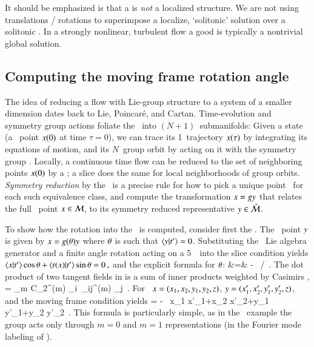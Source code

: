 It should be emphasized is that a {\template} is \emph{not} a
{localized} structure. We are not using translations / rotations to
superimpose a localize, `solitonic' solution over a solitonic {\template}. In
a strongly nonlinear, turbulent flow a good {\template} is typically a
nontrivial global solution.

\subsection{Computing the moving frame rotation angle}
\label{exam:CLErotAngle}

															\toCB
The idea of reducing a flow with Lie-group structure to a system of
a smaller dimension dates back to Lie, Poincar\'e, and Cartan.
Time-evolution and symmetry group actions foliate the \statesp\ into
$(N\!+\!1)$\dmn\ submanifolds: Given a state (a \statesp\ point $x(0)$
at time $\tau=0$), we can trace its  1\dmn\ trajectory $x(\tau)$ by
integrating its equations of motion, and its $N$\dmn\ group orbit by
acting on it with the symmetry group \Group. Locally, a continuous time
flow can be reduced to the set of neighboring points $x(0)$ by a
\PoincSec; a slice does the same for local neighborhoods of group orbits.
{\em Symmetry reduction} by the \mframes\ is a precise rule for
how to pick a unique point \sspRed\ for each such equivalence class, and
compute the transformation $x =g y$ that relates the full
\statesp\ point  $x \in {\cal M}$, to its symmetry reduced representative
$y \in \bar{\cal M}$.

To show how the rotation into the \slice\ is computed, consider first the
\cLe. The \reducedsp\ point $y$ is given by
$x=g({\bf \theta}) y$ where ${\bf \theta}$ is such that
$\braket{\sspRed}{\sliceTan{}}=0$. Substituting the \ Lie algebra
generator and a finite angle  rotation  acting on a
5\dmn\ \statesp\ into the slice condition 
yields
\(\braket{\ssp}{\sliceTan{}}\cos\gSpace
    +\braket{\groupTan_{}(\ssp)}{\sliceTan{}} \sin\gSpace
= 0
\,,
\)
and the explicit formula for ${\bf \theta}$:
\bea
\tan\gSpace &=&
   - \, {\braket{\ssp}{\sliceTan{}}}/
          {\braket{\groupTan_{}(\ssp)}{\sliceTan{}}}
\,.
\label{SL:CLEsliceRot}
\eea
The dot product of two tangent fields in  is a
sum of inner products weighted by Casimirs ,
\beq
\braket{\groupTan(\sspRed)}{\groupTan(\slicep)}
   = \sum_m C_2^{(m)} {\sspRed}_i\, \delta_{ij}^{(m)} \slicep_j
\,.
For \cLe\
$x = (x_1,x_2,y_1,y_2,z)$,
$y = (x_1',x_2',y_1',y_2',z)$,
and the moving frame condition  yields
\beq
\tan\gSpace =
- \, 
       {x_1 x'_1+x_2 x'_2+y_1 y'_1+y_2 y'_2}
\,.
This formula is particularly simple, as in the \cLe\
example the group acts only through $m=0$ and $m=1$ representations
(in the Fourier mode labeling of ).

